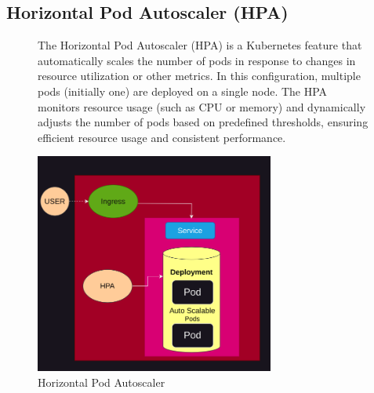 \documentclass{article}
\begin{document}
\subsection{Horizontal Pod Autoscaler (HPA)}
\nobreak
\vspace{-30px}
\begin{figure}[h]
    \begin{minipage}[t]{0.6\textwidth}
        \vspace{-120px}
        The Horizontal Pod Autoscaler (HPA) is a Kubernetes feature that automatically
        scales the number of pods in response to changes in resource utilization or
        other metrics. In this configuration, multiple pods (initially one) are
        deployed on a single node. The HPA monitors resource usage (such as CPU or
        memory) and dynamically adjusts the number of pods based on predefined
        thresholds, ensuring efficient resource usage and consistent performance.
    \end{minipage}%
    \hfill
    \begin{minipage}[b]{0.4\textwidth}
        \centering
        \includegraphics[width=0.7\textwidth]{../images/hpa.png}
        \caption{Horizontal Pod Autoscaler}
        \label{fig:hpa}
    \end{minipage}
\end{figure}

\newpage
\vspace{-10px}
\end{document}
